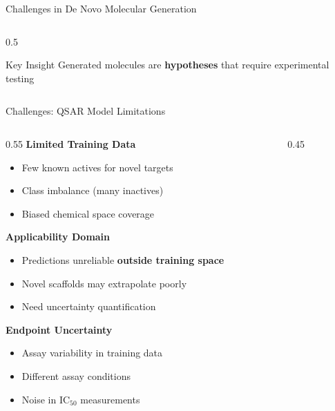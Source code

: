 \documentclass[aspectratio=169,xcolor=table]{beamer}
\begin{document}
\begin{frame}{Challenges in De Novo Molecular Generation}
\begin{columns}
\begin{column}{0.5\textwidth}
\vspace{0.3cm}

\begin{alertblock}{Key Insight}
Generated molecules are \textbf{hypotheses} that require experimental testing
\end{alertblock}
\end{column}
\end{columns}

\end{frame}

\begin{frame}{Challenges: QSAR Model Limitations}

\begin{columns}
\begin{column}{0.55\textwidth}
\textbf{Limited Training Data}
\begin{itemize}\setlength{\itemsep}{2pt}
    \item Few known actives for novel targets
    \item Class imbalance (many inactives)
    \item Biased chemical space coverage
\end{itemize}

\vspace{0.3cm}

\textbf{Applicability Domain}
\begin{itemize}\setlength{\itemsep}{2pt}
    \item Predictions unreliable \textbf{outside training space}
    \item Novel scaffolds may extrapolate poorly
    \item Need uncertainty quantification
\end{itemize}

\vspace{0.3cm}

\textbf{Endpoint Uncertainty}
\begin{itemize}\setlength{\itemsep}{0pt}
    \item Assay variability in training data
    \item Different assay conditions
    \item Noise in IC$_{50}$ measurements
\end{itemize}
\end{column}

\begin{column}{0.45\textwidth}
\begin{center}
\end{center}
\end{column}
\end{columns}
\end{frame}
\end{document}
